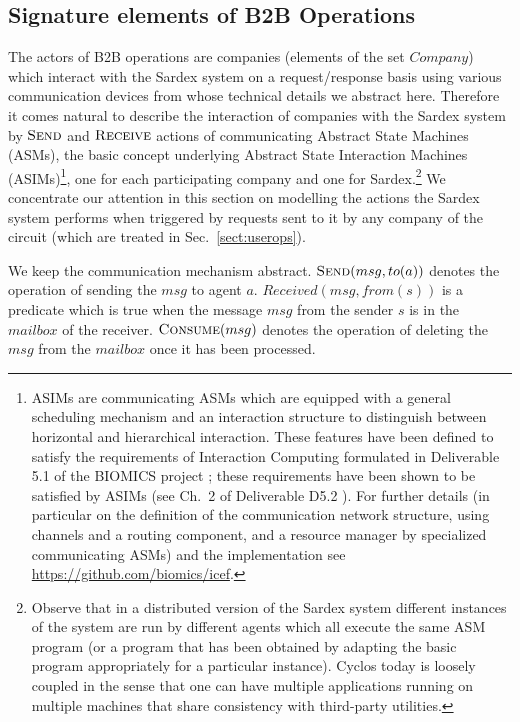 \subsection{Signature elements of B2B Operations}
\label{signaturepaymtop}
The actors of B2B operations are companies (elements of the set $Company$) which interact with the Sardex system on a request/response basis using various communication devices from whose technical details we abstract here. Therefore it comes natural to describe the interaction of companies with the Sardex system by $\hbox{\sc Send}$ and $\hbox{\sc Receive}$ actions of communicating Abstract State Machines (ASMs), the basic concept underlying Abstract State Interaction Machines (ASIMs)\footnote{ASIMs are communicating ASMs which are equipped with a general scheduling mechanism and an interaction structure to distinguish between horizontal and hierarchical interaction. These features have been defined to satisfy the requirements of Interaction Computing formulated in Deliverable 5.1 of the BIOMICS project  \cite{BIOMICSD51}; these requirements have been shown to be satisfied by ASIMs (see Ch.\ 2 of Deliverable D5.2 \cite{BIOMICSD52}). For further details (in particular on the definition of the communication network structure, using channels and a routing component, and a resource manager by specialized communicating ASMs) and the implementation see \url{https://github.com/biomics/icef}.}, one for each participating company and one for Sardex.\footnote{Observe that in a distributed version of the Sardex system different instances of the system are run by different agents which all execute the same ASM program (or a program that has been obtained by adapting the basic program appropriately for a particular instance). Cyclos today is loosely coupled in the sense that one can have multiple applications running on multiple machines that share consistency with third-party utilities.} We concentrate our attention in this section on modelling the actions the Sardex system performs when triggered by requests sent to it by any company of the circuit (which are treated in Sec.~\ref{sect:userops}).

We keep the communication mechanism abstract. $\hbox{\sc Send}(msg,to(a))$ denotes the operation of sending the $msg$ to agent $a$. 
$Received(msg,from(s))$ is a predicate which is true when the message $msg$ from the sender $s$ is in the $mailbox$ of the receiver. $\hbox{\sc Consume}(msg)$ denotes the operation of deleting the $msg$ from the $mailbox$ once it has been processed. 

